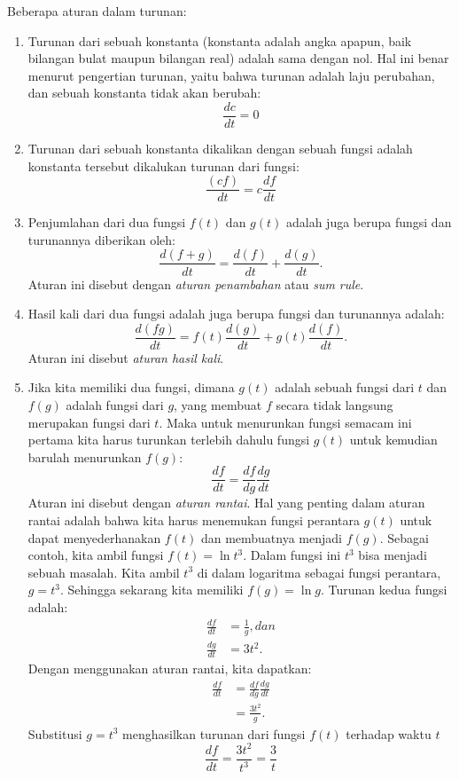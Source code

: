 Beberapa aturan dalam turunan:
\begin{enumerate}
\item Turunan dari sebuah konstanta (konstanta adalah angka apapun, baik bilangan bulat maupun bilangan real) adalah sama dengan nol. Hal ini benar menurut pengertian turunan, yaitu bahwa turunan adalah laju perubahan, dan sebuah konstanta tidak akan berubah:
\[
\frac{dc}{dt}=0
\]
\item Turunan dari sebuah konstanta dikalikan dengan sebuah fungsi adalah konstanta tersebut dikalukan turunan dari fungsi:
\[
\frac{(cf)}{dt}=c\frac{df}{dt}
\]
\item Penjumlahan dari dua fungsi $f(t)$ dan $g(t)$ adalah juga berupa fungsi dan turunannya diberikan oleh:
\[
\frac{d(f+g)}{dt}=\frac{d(f)}{dt}+\frac{d(g)}{dt}.
\]
Aturan ini disebut dengan \textit{aturan penambahan} atau \textit{sum rule}.
\item Hasil kali dari dua fungsi adalah juga berupa fungsi dan turunannya adalah:
\[
\frac{d(fg)}{dt}=f(t)\frac{d(g)}{dt}+g(t)\frac{d(f)}{dt}.
\]
Aturan ini disebut \textit{aturan hasil kali}.
\item Jika kita memiliki dua fungsi, dimana $g(t)$ adalah sebuah fungsi dari $t$ dan $f(g)$ adalah fungsi dari $g$, yang membuat $f$ secara tidak langsung merupakan fungsi dari $t$. Maka untuk menurunkan fungsi semacam ini pertama kita harus turunkan terlebih dahulu fungsi $g(t)$ untuk kemudian barulah menurunkan $f(g)$:
\[
\frac{df}{dt}=\frac{df}{dg}\frac{dg}{dt}
\]
Aturan ini disebut dengan \textit{aturan rantai}. Hal yang penting dalam aturan rantai adalah bahwa kita harus menemukan fungsi perantara $g(t)$ untuk dapat menyederhanakan $f(t)$ dan membuatnya menjadi $f(g)$. Sebagai contoh, kita ambil fungsi $f(t)=\ln t^3$. Dalam fungsi ini $t^3$ bisa menjadi sebuah masalah. Kita ambil $t^3$ di dalam logaritma sebagai fungsi perantara, $g=t^3$. Sehingga sekarang kita memiliki $f(g)=\ln g$. Turunan kedua fungsi adalah:
\begin{align*}
\frac{df}{dt}&=\frac{1}{g}, dan\\
\frac{dg}{dt}&=3t^2.
\end{align*}
Dengan menggunakan aturan rantai, kita dapatkan:
\begin{align*}
\frac{df}{dt}&=\frac{df}{dg}\frac{dg}{dt}\\
&=\frac{3t^2}{g}.
\end{align*}
Substitusi $g=t^3$ menghasilkan turunan dari fungsi $f(t)$ terhadap waktu $t$
\[
\frac{df}{dt}=\frac{3t^2}{t^3}=\frac{3}{t}
\]   
\end{enumerate}
